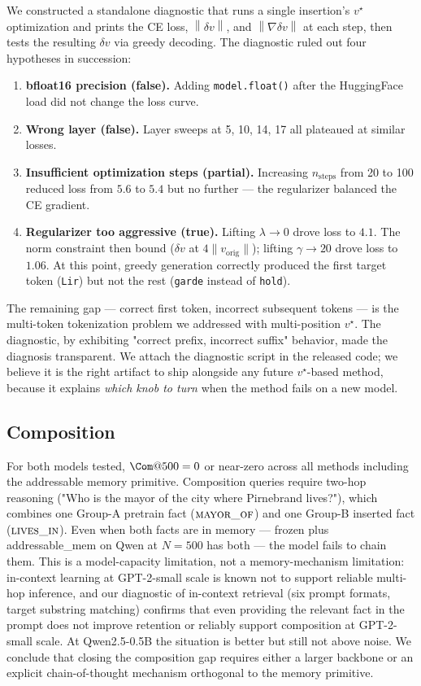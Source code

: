 \documentclass[11pt,a4paper]{article}
\newcommand{\norm}[1]{\left\|#1\right\|}
\begin{document}
We constructed a standalone diagnostic that runs a single insertion's
$v^\star$ optimization and prints the CE loss, $\norm{\delta v}$, and
$\norm{\nabla \delta v}$ at each step, then tests the resulting
$\delta v$ via greedy decoding. The diagnostic ruled out four
hypotheses in succession:
\begin{enumerate}[leftmargin=*,topsep=2pt,itemsep=1pt]
\item \textbf{bfloat16 precision (false).} Adding \texttt{model.float()}
after the HuggingFace load did not change the loss curve.
\item \textbf{Wrong layer (false).} Layer sweeps at 5, 10, 14, 17 all
plateaued at similar losses.
\item \textbf{Insufficient optimization steps (partial).} Increasing
$n_\text{steps}$ from 20 to 100 reduced loss from $5.6$ to $5.4$ but
no further --- the regularizer balanced the CE gradient.
\item \textbf{Regularizer too aggressive (true).} Lifting
$\lambda \to 0$ drove loss to $4.1$. The norm constraint then bound
($\delta v$ at $4\|v_\text{orig}\|$); lifting $\gamma \to 20$ drove
loss to $1.06$. At this point, greedy generation correctly produced
the first target token (\texttt{Lir}) but not the rest (\texttt{garde}
instead of \texttt{hold}).
\end{enumerate}
The remaining gap --- correct first token, incorrect subsequent
tokens --- is the multi-token tokenization problem we addressed with
multi-position $v^\star$. The diagnostic, by exhibiting "correct prefix,
incorrect suffix" behavior, made the diagnosis transparent. We attach
the diagnostic script in the released code; we believe it is the
right artifact to ship alongside any future $v^\star$-based method,
because it explains \emph{which knob to turn} when the method fails on
a new model.

\subsection{Composition}

For both models tested, $\Com@500 = 0$ or near-zero across all methods
including the addressable memory primitive. Composition queries require
two-hop reasoning ("Who is the mayor of the city where Pirnebrand
lives?"), which combines one Group-A pretrain fact ($\textsc{mayor\_of}$)
and one Group-B inserted fact ($\textsc{lives\_in}$). Even when both
facts are in memory --- frozen plus addressable\_mem on Qwen at $N = 500$
has both --- the model fails to chain them. This is a model-capacity
limitation, not a memory-mechanism limitation: in-context learning at
GPT-2-small scale is known not to support reliable multi-hop inference,
and our diagnostic of in-context retrieval (six prompt formats, target
substring matching) confirms that even providing the relevant fact in
the prompt does not improve retention or reliably support
composition at GPT-2-small scale. At Qwen2.5-0.5B the situation is
better but still not above noise. We conclude that closing the
composition gap requires either a larger backbone or an explicit
chain-of-thought mechanism orthogonal to the memory primitive.
\end{document}

